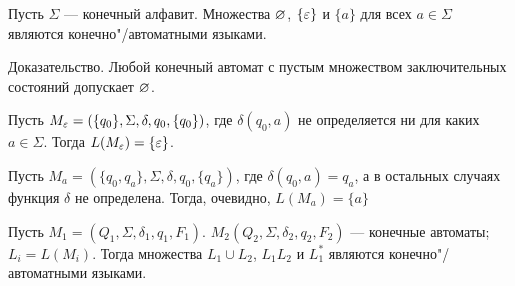 \begin{mylemma}
\label{lemma-FA-of-ElemLangs}
Пусть $\Sigma$ --- конечный алфавит. Множества $\varnothing$, $\{\varepsilon\}$ и $\{a\}$ для всех $a\in\Sigma$ являются конечно"/автоматными языками.
\end{mylemma}

\begin{myproof}
Доказательство. Любой конечный автомат с пустым множеством заключительных состояний допускает $\varnothing$.

Пусть $M_\varepsilon=(\{q_0\},\Sigma,\delta,q_0,\{q_0\})$, где $\delta(q_0,a)$ не определяется ни для каких $a\in\Sigma$. Тогда $L(M_\varepsilon)=\{\varepsilon\}$.

Пусть $M_a=(\{q_0,q_a\},\Sigma,\delta,q_0,\{q_a\})$, где $\delta(q_0,a)=q_a$, а в остальных случаях функция $\delta$ не определена. Тогда, очевидно, $L(M_a)=\{a\}$
\end{myproof}

\begin{mylemma}
\label{lemma-FA-of-OpLangs}
Пусть $M_1=(Q_1,\Sigma,\delta_1,q_1,F_1)$. $M_2(Q_2,\Sigma,\delta_2,q_2,F_2)$ --- конечные автоматы; $L_i=L(M_i)$. Тогда множества $L_1\cup L_2$, $L_1L_2$ и $L_1^*$ являются конечно"/автоматными языками.
\end{mylemma}

